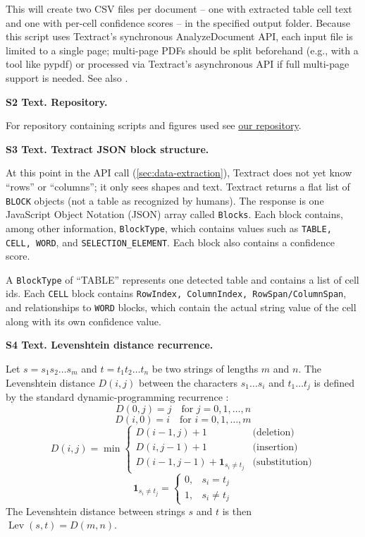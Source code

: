 \documentclass[12pt]{article}
\begin{document}
\noindent This will create two CSV files per document -- one with extracted table cell text and one with per-cell confidence scores -- in the specified output folder. Because this script uses Textract's synchronous AnalyzeDocument API, each input file is limited to a single page; multi-page PDFs should be split beforehand (e.g., with a tool like pypdf) or processed via Textract's asynchronous API if full multi-page support is needed. See also \cite{aws_textract}.

\noindent\textbf{S2 Text. Repository.}

For repository containing scripts and figures used see \href{https://github.com/EdenNal/Textract_Results}{our repository}.

\bigskip
\noindent\textbf{S3 Text. Textract JSON block structure.}

At this point in the API call (\cref{sec:data-extraction}), Textract does not yet know ``rows'' or ``columns''; it only sees shapes and text. Textract returns a flat list of \texttt{BLOCK} objects (not a table as recognized by humans). The response is one JavaScript Object Notation (JSON) array called \texttt{Blocks}. Each block contains, among other information, \texttt{BlockType}, which contains values such as \texttt{TABLE, CELL, WORD}, and \texttt{SELECTION\_ELEMENT}. Each block also contains a confidence score.

A \texttt{BlockType} of ``TABLE'' represents one detected table and contains a list of cell ids. Each \texttt{CELL} block contains \texttt{RowIndex, ColumnIndex, RowSpan/ColumnSpan}, and relationships to \texttt{WORD} blocks, which contain the actual string value of the cell along with its own confidence value.

\bigskip
\noindent\textbf{S4 Text. Levenshtein distance recurrence.}

Let $s = s_1 s_2 \dots s_m$ and $t = t_1 t_2 \dots t_n$ be two strings of lengths $m$ and $n$. The Levenshtein distance $D(i,j)$ between the characters $s_1 \dots s_i$ and $t_1 \dots t_j$ is defined by the standard dynamic-programming recurrence \cite{wagner1974string}:
\[
D(0,j) = j \quad \text{for } j = 0,1,\dots,n
\]
\[
D(i,0) = i \quad \text{for } i = 0,1,\dots,m
\]
\[
D(i,j) =
\min \begin{cases}
D(i-1,j) + 1 & \text{(deletion)} \\
D(i,j-1) + 1 & \text{(insertion)} \\
D(i-1,j-1) + \mathbf{1}_{s_i \neq t_j} & \text{(substitution)}
\end{cases}
\]
\[
\mathbf{1}_{s_i \neq t_j} =
\begin{cases}
0, & s_i = t_j \\
1, & s_i \neq t_j
\end{cases}
\]
The Levenshtein distance between strings $s$ and $t$ is then $\operatorname{Lev}(s,t) = D(m,n)$.
\end{document}
